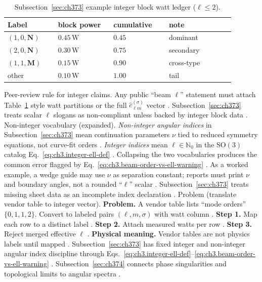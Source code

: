 \begin{table}[t]
\centering
\caption{Subsection~\ref{sec:ch373} example integer block watt ledger (\(\ell\le2\)).}
\label{tab:ch3.373-block-ledger}
\small
\begin{tabular}{@{}p{0.20\linewidth}p{0.22\linewidth}p{0.22\linewidth}p{0.26\linewidth}@{}}
\toprule
Label & block power & cumulative & note \\
\midrule
$(1,0,\mathbf{N})$ & $0.45\,\mathrm{W}$ & $0.45$ & dominant \\
$(2,0,\mathbf{N})$ & $0.30\,\mathrm{W}$ & $0.75$ & secondary \\
$(1,1,\mathbf{M})$ & $0.15\,\mathrm{W}$ & $0.90$ & cross-type \\
other & $0.10\,\mathrm{W}$ & $1.00$ & tail \\
\bottomrule
\end{tabular}
\end{table}
Peer-review rule for integer claims. Any public ``beam \(\ell\)'' statement must attach Table~\ref{tab:ch3.373-block-ledger} style watt partitions or the full
\(\widehat{c}_{\ell m}^{(\sigma)}\) vector \cite{harrington2001}. Subsection~\ref{sec:ch373} treats scalar
\(\ell\) slogans as non-compliant unless backed by integer block data \cite{hansen1988}.
Non-integer vocabulary (expanded). \emph{Non-integer angular indices} in Subsection~\ref{sec:ch373} mean continuation parameters \(\nu\) tied to reduced symmetry
equations, not curve-fit orders \cite{stratton1941}. \emph{Integer indices} mean \(\ell\in\mathbb{N}_{0}\) in the
\(\mathrm{SO}(3)\) catalog Eq.~\eqref{eq:ch3.integer-ell-def} \cite{jackson1999}. Collapsing the two vocabularies
produces the common error flagged by Eq.~\eqref{eq:ch3.beam-order-vs-ell-warning} \cite{harrington2001}.
As a worked example, a wedge guide may use \(\nu\) as separation constant; reports must print \(\nu\) and boundary angles, not a rounded ``\(\ell\)'' scalar
\cite{jackson1999}. Subsection~\ref{sec:ch373} treats missing sheet data as an incomplete index declaration
\cite{hansen1988}.
Problem (translate vendor table to integer vector). \textbf{Problem.} A vendor table lists ``mode orders'' \(\{0,1,1,2\}\). Convert to labeled pairs \((\ell,m,\sigma)\) with watt column
\cite{harrington2001}.
\textbf{Step 1.} Map each row to a distinct label \cite{hansen1988}.
\textbf{Step 2.} Attach measured watts per row \cite{poynting1884}.
\textbf{Step 3.} Reject merged effective \(\ell\) \cite{harrington2001}.
\textbf{Physical meaning.} Vendor tables are not physics labels until mapped \cite{stratton1941}.
Subsection~\ref{sec:ch373} has fixed integer and non-integer angular index discipline through
Eqs.~\eqref{eq:ch3.integer-ell-def}--\eqref{eq:ch3.beam-order-vs-ell-warning}
\cite{jackson1999}. Subsection~\ref{sec:ch374} connects phase singularities and topological
limits to angular spectra \cite{allen1992}.

